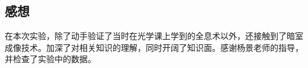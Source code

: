 \documentclass[a4paper]{article}
\begin{document}
\subsection{感想}
\hspace{2em}在本次实验，除了动手验证了当时在光学课上学到的全息术以外，还接触到了暗室成像技术。加深了对相关知识的理解，同时开阔了知识面。感谢杨景老师的指导，并检查了实验中的数据。
\par
\end{document}
